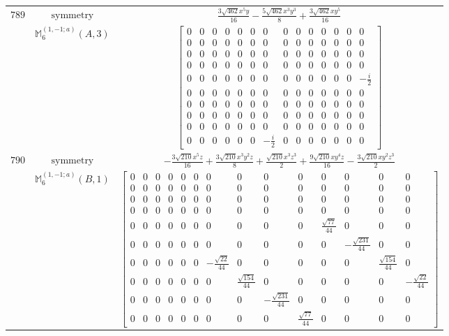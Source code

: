 \documentclass[fleqn,8pt,landscape]{jsarticle}
\begin{document}
\begin{longtable}{ccc}
$ 789 $ & $ \text{symmetry} $ & $ \frac{3 \sqrt{462} x^{5} y}{16} - \frac{5 \sqrt{462} x^{3} y^{3}}{8} + \frac{3 \sqrt{462} x y^{5}}{16} $ \\
$  $ & $ \mathbb{M}_{6}^{(1,-1;a)}(A,3) $ & $ \begin{bmatrix} 0 & 0 & 0 & 0 & 0 & 0 & 0 & 0 & 0 & 0 & 0 & 0 & 0 & 0 \\ 0 & 0 & 0 & 0 & 0 & 0 & 0 & 0 & 0 & 0 & 0 & 0 & 0 & 0 \\ 0 & 0 & 0 & 0 & 0 & 0 & 0 & 0 & 0 & 0 & 0 & 0 & 0 & 0 \\ 0 & 0 & 0 & 0 & 0 & 0 & 0 & 0 & 0 & 0 & 0 & 0 & 0 & 0 \\ 0 & 0 & 0 & 0 & 0 & 0 & 0 & 0 & 0 & 0 & 0 & 0 & 0 & - \frac{i}{2} \\ 0 & 0 & 0 & 0 & 0 & 0 & 0 & 0 & 0 & 0 & 0 & 0 & 0 & 0 \\ 0 & 0 & 0 & 0 & 0 & 0 & 0 & 0 & 0 & 0 & 0 & 0 & 0 & 0 \\ 0 & 0 & 0 & 0 & 0 & 0 & 0 & 0 & 0 & 0 & 0 & 0 & 0 & 0 \\ 0 & 0 & 0 & 0 & 0 & 0 & 0 & 0 & 0 & 0 & 0 & 0 & 0 & 0 \\ 0 & 0 & 0 & 0 & 0 & 0 & - \frac{i}{2} & 0 & 0 & 0 & 0 & 0 & 0 & 0 \end{bmatrix} $ \\ \hline
$ 790 $ & $ \text{symmetry} $ & $ - \frac{3 \sqrt{210} x^{5} z}{16} + \frac{3 \sqrt{210} x^{3} y^{2} z}{8} + \frac{\sqrt{210} x^{3} z^{3}}{2} + \frac{9 \sqrt{210} x y^{4} z}{16} - \frac{3 \sqrt{210} x y^{2} z^{3}}{2} $ \\
$  $ & $ \mathbb{M}_{6}^{(1,-1;a)}(B,1) $ & $ \begin{bmatrix} 0 & 0 & 0 & 0 & 0 & 0 & 0 & 0 & 0 & 0 & 0 & 0 & 0 & 0 \\ 0 & 0 & 0 & 0 & 0 & 0 & 0 & 0 & 0 & 0 & 0 & 0 & 0 & 0 \\ 0 & 0 & 0 & 0 & 0 & 0 & 0 & 0 & 0 & 0 & 0 & 0 & 0 & 0 \\ 0 & 0 & 0 & 0 & 0 & 0 & 0 & 0 & 0 & 0 & 0 & 0 & 0 & 0 \\ 0 & 0 & 0 & 0 & 0 & 0 & 0 & 0 & 0 & 0 & \frac{\sqrt{77}}{44} & 0 & 0 & 0 \\ 0 & 0 & 0 & 0 & 0 & 0 & 0 & 0 & 0 & 0 & 0 & - \frac{\sqrt{231}}{44} & 0 & 0 \\ 0 & 0 & 0 & 0 & 0 & 0 & - \frac{\sqrt{22}}{44} & 0 & 0 & 0 & 0 & 0 & \frac{\sqrt{154}}{44} & 0 \\ 0 & 0 & 0 & 0 & 0 & 0 & 0 & \frac{\sqrt{154}}{44} & 0 & 0 & 0 & 0 & 0 & - \frac{\sqrt{22}}{44} \\ 0 & 0 & 0 & 0 & 0 & 0 & 0 & 0 & - \frac{\sqrt{231}}{44} & 0 & 0 & 0 & 0 & 0 \\ 0 & 0 & 0 & 0 & 0 & 0 & 0 & 0 & 0 & \frac{\sqrt{77}}{44} & 0 & 0 & 0 & 0 \end{bmatrix} $ \\ \hline

\end{longtable}
\end{document}
